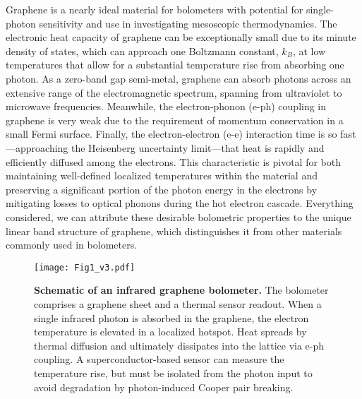 \documentclass[aip, amsmath,amssymb, reprint]{revtex4-1}
\begin{document}
Graphene is a nearly ideal material for bolometers\cite{Ryzhii.2013,Cai.2014,Fatimy.2016,Sassi.2017,Zoghi.2019,Blaikie.2019,Xie.2019,Miao.2018,Skoblin.2018,Haller.2022,Chen.2022} with potential for single-photon sensitivity\cite{Vora.20128z,Yan.2012ldkp,Fong.2012,Lee.2020,Kokkoniemi.2020,Seifert.2020,Battista.2022} and use in investigating mesoscopic thermodynamics\cite{Walsh.2017,Lee.2020,Pekola.2022}. The electronic heat capacity of graphene can be exceptionally small due to its minute density of states, which can approach one Boltzmann constant, $k_B$, at low temperatures\cite{Vora.20128z,Fong.2012,Aamir.2021} that allow for a substantial temperature rise from absorbing one photon. As a zero-band gap semi-metal, graphene can absorb photons across an extensive range of the electromagnetic spectrum, spanning from ultraviolet to microwave frequencies\cite{Sarma.2011}. Meanwhile, the electron-phonon (e-ph) coupling in graphene is very weak\cite{Hwang.2008,Bistritzer.2009,Kubakaddi.2009,Viljas.2010,Song.2012,Chen.2012,Massicotte.2021} due to the requirement of momentum conservation in a small Fermi surface. Finally, the electron-electron (e-e) interaction time is so fast---approaching the Heisenberg uncertainty limit---that heat is rapidly and efficiently diffused among the electrons\cite{Lucas.201738q,Gallagher.2019,Block.2021}. This characteristic is pivotal for both maintaining well-defined localized temperatures within the material and preserving a significant portion of the photon energy in the electrons by mitigating losses to optical phonons during the hot electron cascade\cite{Song.201102t,Tielrooij.2013}. Everything considered, we can attribute these desirable bolometric properties to the unique linear band structure of graphene, which distinguishes it from other materials commonly used in bolometers.

\begin{figure}\centering
\texttt{[image: Fig1\_v3.pdf]}
\caption{\textbf{Schematic of an infrared graphene bolometer.} The bolometer comprises a graphene sheet and a thermal sensor readout. When a single infrared photon is absorbed in the graphene, the electron temperature is elevated in a localized hotspot. Heat spreads by thermal diffusion and ultimately dissipates into the lattice via e-ph coupling. A superconductor-based sensor can measure the temperature rise, but must be isolated from the photon input to avoid degradation by photon-induced Cooper pair breaking.}
\label{fig:concept}
\end{figure}
\end{document}
